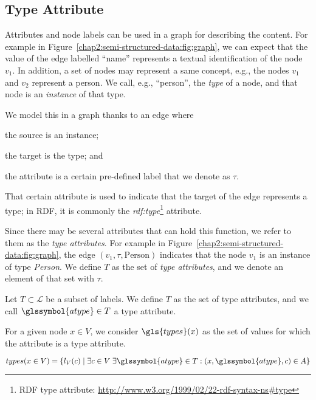 \subsection{Type Attribute}
\label{sec:ssd:type}

Attributes and node labels can be used in a graph for describing the content. For example in Figure~\ref{chap2:semi-structured-data:fig:graph}, we can expect that the value of the edge labelled ``name'' represents a textual identification of the node $v_1$. In addition, a set of nodes may represent a same concept, e.g., the nodes $v_1$ and $v_2$ represent a person. We call, e.g., ``person'', the \emph{type} of a node, and that node is an \emph{instance} of that type.

We model this in a graph thanks to an edge where
\begin{inparaenum}[(1)]
\item the source is an instance;
\item the target is the type; and
\item the attribute is a certain pre-defined label that we denote as $\tau$.
\end{inparaenum}
That certain attribute is used to indicate that the target of the edge represents a type; in RDF, it is commonly the \emph{rdf:type}\footnote{RDF type attribute: \url{http://www.w3.org/1999/02/22-rdf-syntax-ns\#type}} attribute.

Since there may be several attributes that can hold this function, we refer to them as the \emph{type attributes}. For example in Figure~\ref{chap2:semi-structured-data:fig:graph}, the edge $(v_1, \tau, \text{Person})$ indicates that the node $v_1$ is an instance of type \emph{Person}.
We define $T$ as the set of \emph{type attributes}, and we denote an element of that set with $\tau$.%

\begin{definition}
Let $T \subset \mathcal{L}$ be a subset of labels.
We define $T$ as the set of type attributes, and we call $\glssymbol{atype} \in T$ a type attribute.
\end{definition}

For a given node $x \in V$, we consider $\gls{types}(x)$ as the set of values for which the attribute is a type attribute.

$$
types(x\in V) = \left\lbrace l_V(c) \mid \exists c \in V\; \exists \glssymbol{atype} \in T: (x, \glssymbol{atype}, c) \in A \right\rbrace
$$

